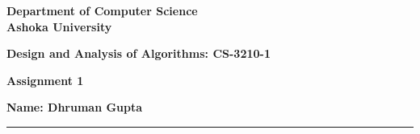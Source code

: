 \documentclass[a4paper]{article}
\begin{document}
\begin{center}
{\large \bf \color{red}  Department of Computer Science} \\
{\large \bf \color{red}  Ashoka University} \\

\vspace{0.1in}

{\large \bf \color{blue}  Design and Analysis of Algorithms: CS-3210-1}

\vspace{0.05in}

    { \bf \color{YellowOrange} Assignment 1}
\end{center}
\medskip

{\textbf{Name: Dhruman Gupta} }

\bigskip
\hrule
\end{document}
